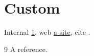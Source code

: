 \documentclass{article}
\begin{document}
\section{Custom}\label{sec:c}
Internal \ref{sec:c}, web \href{https://example.org}{a site}, cite \cite{key}.
\begin{thebibliography}{9}
 A reference.
\end{thebibliography}
\end{document}
